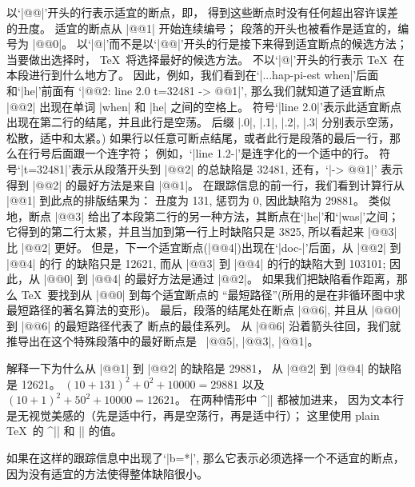 \enddisplay
\1以`|@@|'开头的行表示{适宜的}断点，即，
得到这些断点时没有任何超出容许误差的丑度。%
适宜的断点从 |@@1| 开始连续编号；
段落的开头也被看作是适宜的，编号为 |@@0|。%
以`|@|'而不是以`|@@|'开头的行是接下来得到适宜断点的候选方法；
当要做出选择时， \TeX\ 将选择最好的候选方法。%
不以`|@|'开头的行表示 \TeX\ 在本段进行到什么地方了。%
因此，例如，我们看到在`|...hap-pi-est when|'后面和`|he|'前面有%
`|@@2: line 2.0 t=32481 -> @@1|',
那么我们就知道了适宜断点 |@@2| 出现在单词 |when| 和 |he| 之间的空格上。%
符号`|line 2.0|'表示此适宜断点出现在第二行的结尾，并且此行是空荡。%
后缀 |.0|, |.1|, |.2|, |.3| 分别表示空荡，松散，适中和太紧。)
如果行以任意可断点结尾，或者此行是段落的最后一行，那么在行号后面跟一个连字符；
例如，`|line 1.2-|'是连字化的一个适中的行。%
符号`|t=32481|'表示从段落开头到 |@@2| 的总缺陷是 32481,
还有，`|-> @@1|' 表示得到 |@@2| 的最好方法是来自 |@@1|。%
在跟踪信息的前一行，我们看到计算行从 |@@1| 到此点的排版结果为：
丑度为 131, 惩罚为 0, 因此缺陷为 29881。%
类似地，断点 |@@3| 给出了本段第二行的另一种方法，其断点在`|he|'和`|was|'之间；
它得到的第二行太紧，并且当加到第一行上时缺陷只是 3825,
所以看起来 |@@3| 比 |@@2| 更好。%
但是，下一个适宜断点(|@@4|)出现在`|doc-|'后面，从 |@@2| 到 |@@4| 的行%
的缺陷只是 12621,
而从 |@@3| 到 |@@4| 的行的缺陷大到 103101;
因此，从 |@@0| 到 |@@4| 的最好方法是通过 |@@2|。%
如果我们把缺陷看作距离，那么 \TeX\ 要找到从 |@@0| 到每个适宜断点的%
``最短路径''(所用的是在非循环图中求最短路径的著名算法的变形)。%
最后，段落的结尾处在断点 |@@6|, 并且从 |@@0| 到 |@@6| 的最短路径代表了%
断点的最佳系列。%
从 |@@6| 沿着箭头往回，我们就推导出在这个特殊段落中的最好断点是%
~|@@5|, |@@3|, |@@1|。

\ddangerexercise 解释一下为什么从 |@@1| 到 |@@2| 的缺陷是 29881，
从 |@@2| 到 |@@4| 的缺陷是 12621。
\answer $(10+131)^2+0^2+10000=29881$ 以及 $(10+1)^2+50^2+10000=12621$。
在两种情形中 ^|\adjdemerits| 都被加进来，
因为文本行是无视觉美感的（先是适中行，再是空荡行，再是适中行）；
这里使用 plain \TeX\ 的 ^|\linepenalty| 和 |\adjdemerits| 的值。

\ddanger 如果在这样的跟踪信息中出现了`|b=*|', 那么它表示必须选择一个不适宜的断点，
因为没有适宜的方法使得整体缺陷很小。

